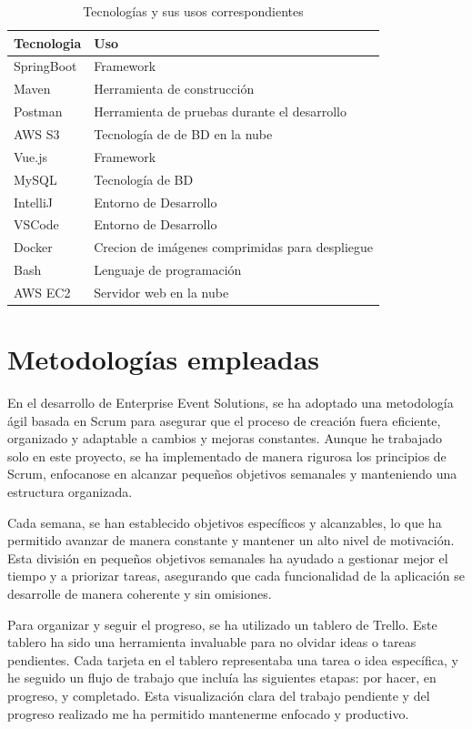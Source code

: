 \begin{table}[h]
\begin{tabular}{ p{3cm} l  }

    \hline
    Tecnologia& Uso \\
    \hline
    SpringBoot   & Framework \\
    Maven &   Herramienta de construcción \\
    Postman & Herramienta de pruebas durante el desarrollo \\
    AWS S3& Tecnología de de BD en la nube  \\
    Vue.js & Framework  \\
    MySQL    & Tecnología de BD \\
    IntelliJ&   Entorno de Desarrollo  \\
    VSCode& Entorno de Desarrollo \\
    Docker& Crecion de imágenes comprimidas para despliegue  \\
    Bash& Lenguaje de programación \\
    AWS EC2& Servidor web en la nube  \\
    \hline
   \end{tabular}
   \caption{Tecnologías y sus usos correspondientes}
   \label{tabla:tecnologias_usos}
\end{table}


\section{Metodologías empleadas}
En el desarrollo de Enterprise Event Solutions, se ha adoptado una metodología ágil basada en Scrum para asegurar que el proceso de creación 
fuera eficiente, organizado y adaptable a cambios y mejoras constantes. Aunque he trabajado solo en este proyecto, se ha implementado de manera 
rigurosa los principios de Scrum, enfocanose en alcanzar pequeños objetivos semanales y manteniendo una estructura organizada.

Cada semana, se han establecido objetivos específicos y alcanzables, lo que ha permitido avanzar de manera constante y mantener un alto nivel 
de motivación. Esta división en pequeños objetivos semanales ha ayudado a gestionar mejor el tiempo y a priorizar tareas, asegurando que cada 
funcionalidad de la aplicación se desarrolle de manera coherente y sin omisiones.

Para organizar y seguir el progreso, se ha utilizado un tablero de Trello. Este tablero ha sido una herramienta invaluable para no olvidar ideas o 
tareas pendientes. Cada tarjeta en el tablero representaba una tarea o idea específica, y he seguido un flujo de trabajo que incluía las siguientes 
etapas: por hacer, en progreso, y completado. Esta visualización clara del trabajo pendiente y del progreso realizado me ha permitido mantenerme 
enfocado y productivo.

